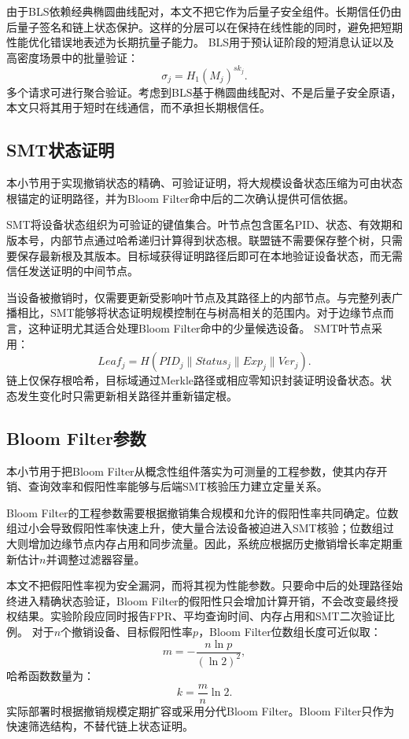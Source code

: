 \documentclass[conference]{IEEEtran}
\begin{document}
	由于BLS依赖经典椭圆曲线配对，本文不把它作为后量子安全组件。长期信任仍由后量子签名和链上状态保护。这样的分层可以在保持在线性能的同时，避免把短期性能优化错误地表述为长期抗量子能力。
	BLS用于预认证阶段的短消息认证以及高密度场景中的批量验证：
	\begin{equation}
		\sigma_j=H_1(M_j)^{sk_j}.
	\end{equation}
	多个请求可进行聚合验证。考虑到BLS基于椭圆曲线配对、不是后量子安全原语，本文只将其用于短时在线通信，而不承担长期根信任。
	
	\subsection{SMT状态证明}
	
	本小节用于实现撤销状态的精确、可验证证明，将大规模设备状态压缩为可由状态根锚定的证明路径，并为Bloom Filter命中后的二次确认提供可信依据。
	
	SMT将设备状态组织为可验证的键值集合。叶节点包含匿名PID、状态、有效期和版本号，内部节点通过哈希递归计算得到状态根。联盟链不需要保存整个树，只需要保存最新根及其版本。目标域获得证明路径后即可在本地验证设备状态，而无需信任发送证明的中间节点。
	
	当设备被撤销时，仅需要更新受影响叶节点及其路径上的内部节点。与完整列表广播相比，SMT能够将状态证明规模控制在与树高相关的范围内。对于边缘节点而言，这种证明尤其适合处理Bloom Filter命中的少量候选设备。
	SMT叶节点采用：
	\begin{equation}
		Leaf_j=H(PID_j\parallel Status_j\parallel Exp_j\parallel Ver_j).
	\end{equation}
	链上仅保存根哈希，目标域通过Merkle路径或相应零知识封装证明设备状态。状态发生变化时只需更新相关路径并重新锚定根。
	
	\subsection{Bloom Filter参数}
	
	本小节用于把Bloom Filter从概念性组件落实为可测量的工程参数，使其内存开销、查询效率和假阳性率能够与后端SMT核验压力建立定量关系。
	
	Bloom Filter的工程参数需要根据撤销集合规模和允许的假阳性率共同确定。位数组过小会导致假阳性率快速上升，使大量合法设备被迫进入SMT核验；位数组过大则增加边缘节点内存占用和同步流量。因此，系统应根据历史撤销增长率定期重新估计$n$并调整过滤器容量。
	
	本文不把假阳性率视为安全漏洞，而将其视为性能参数。只要命中后的处理路径始终进入精确状态验证，Bloom Filter的假阳性只会增加计算开销，不会改变最终授权结果。实验阶段应同时报告FPR、平均查询时间、内存占用和SMT二次验证比例。
	对于$n$个撤销设备、目标假阳性率$p$，Bloom Filter位数组长度可近似取：
	\begin{equation}
		m=-\frac{n\ln p}{(\ln2)^2},
	\end{equation}
	哈希函数数量为：
	\begin{equation}
		k=\frac{m}{n}\ln2.
	\end{equation}
	实际部署时根据撤销规模定期扩容或采用分代Bloom Filter。Bloom Filter只作为快速筛选结构，不替代链上状态证明。
	
\end{document}

